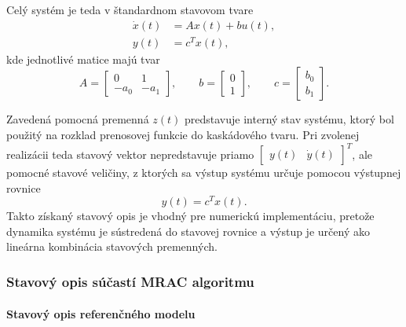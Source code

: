 Celý systém je teda v štandardnom stavovom tvare
\begin{align}
	\dot{x}(t) &= A x(t) + b u(t),
	\\
	y(t) &= c^{T} x(t),
\end{align}
kde jednotlivé matice majú tvar
\begin{equation}
	A =
	\begin{bmatrix}
		0 & 1 \\
		- a_0 & - a_1
	\end{bmatrix},
	\qquad
	b =
	\begin{bmatrix}
		0 \\
		1
	\end{bmatrix},
	\qquad
	c =
	\begin{bmatrix}
		b_0 \\
		b_1
	\end{bmatrix}.
\end{equation}

Zavedená pomocná premenná $z(t)$ predstavuje interný stav systému,
ktorý bol použitý na rozklad prenosovej funkcie do kaskádového tvaru.
Pri zvolenej realizácii teda stavový vektor nepredstavuje priamo
$\begin{bmatrix} y(t) & \dot{y}(t) \end{bmatrix}^{T}$,
ale pomocné stavové veličiny, z ktorých sa výstup systému určuje
pomocou výstupnej rovnice
\[
y(t)=c^{T}x(t).
\]
Takto získaný stavový opis je vhodný pre numerickú implementáciu,
pretože dynamika systému je sústredená do stavovej rovnice
a výstup je určený ako lineárna kombinácia stavových premenných.




\subsubsection{Stavový opis súčastí MRAC algoritmu}

\paragraph{Stavový opis referenčného modelu}

